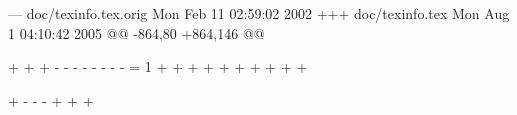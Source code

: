 --- doc/texinfo.tex.orig	Mon Feb 11 02:59:02 2002
+++ doc/texinfo.tex	Mon Aug  1 04:10:42 2005
@@ -864,80 +864,146 @@
 \newif\ifpdf
 \newif\ifpdfmakepagedest
 
+%
+%
+%
 \ifx\pdfoutput\undefined
-  \pdffalse
-  \let\pdfmkdest = \gobble
-  \let\pdfurl = \gobble
-  \let\endlink = \relax
-  \let\linkcolor = \relax
-  \let\pdfmakeoutlines = \relax
 \else
-  \pdftrue
-  \pdfoutput = 1
+  \ifx\pdfoutput\relax
+  \else
+    \ifcase\pdfoutput
+    \else
+      \pdftrue
+    \fi
+  \fi
+\fi
+%
+\ifpdf
   
+  %
   \def\dopdfimage#1#2#3{%
     \def\imagewidth{#2}%
     \def\imageheight{#3}%
+    %
+    %
     \ifnum\pdftexversion < 14
-      \pdfimage
+      \immediate\pdfimage
     \else
-      \pdfximage
+      \immediate\pdfximage
     \fi
       \ifx\empty\imagewidth\else width \imagewidth \fi
       \ifx\empty\imageheight\else height \imageheight \fi
-      {#1.pdf}%
+      \ifnum\pdftexversion<13
+         #1.pdf%
+       \else
+         {#1.pdf}%
+       \fi
     \ifnum\pdftexversion < 14 \else
       \pdfrefximage \pdflastximage
     \fi}
-  \def\pdfmkdest#1{\pdfdest name{#1@} xyz}
-  \def\pdfmkpgn#1{#1@}
-  \let\linkcolor = \Cyan
+  \def\pdfmkdest#1{{%
+    %
+    %
+    \atdummies
+    \normalturnoffactive
+    \pdfdest name{#1} xyz%
+  }}
+  \def\pdfmkpgn#1{#1}
+  \let\linkcolor = \Blue  %
   \def\endlink{\Black\pdfendlink}
   \def\expnumber#1{\expandafter\ifx\csname#1\endcsname\relax 0%
     \else \csname#1\endcsname \fi}
   \def\advancenumber#1{\tempnum=\expnumber{#1}\relax
-    \advance\tempnum by1
+    \advance\tempnum by 1
     \expandafter\xdef\csname#1\endcsname{\the\tempnum}}
